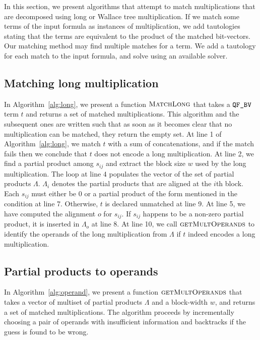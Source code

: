 %
In this section, we %
present algorithms that attempt to match multiplications that are
decomposed using long or Wallace tree multiplication.
%
If we match some terms of the input formula
as instances of 
multiplication, we add tautologies stating that the terms are 
equivalent to the product of the matched bit-vectors.
%
Our matching method may find multiple matches for a term.
%
We add a tautology for each match to the input formula, and solve using
an available solver.

\subsection{Matching long multiplication}


In Algorithm~\ref{alg:long}, we present a function $\textsc{MatchLong}$
that takes a $\texttt{QF\_BV}$ term $t$ and returns a set of matched multiplications.
%
This algorithm and the subsequent ones are written such that as soon
as it becomes clear that no multiplication can be matched,
they return the empty set. 
%
At line 1 of Algorithm~\ref{alg:long}, we match $t$ with a sum of
concatenations, and if the match fails then we conclude that $t$ does not encode 
a long multiplication.
%
At line 2, we find a partial product among $s_{ij}$ and extract
the block size $w$ used by the long multiplication.
%
The loop at line $4$ populates the vector of the set of partial products $\Lambda$.
%
$\Lambda_i$ denotes the partial products that are aligned at the $i$th block.
%
Each $s_{ij}$ must either be $0$ or a partial product of the form mentioned in the
condition at line 7.
%
Otherwise, $t$ is declared unmatched at line 9. 
%
At line 5, we have computed the alignment $o$ for $s_{ij}$.
%
If $s_{ij}$ happens to be a non-zero partial product, it is inserted in
$\Lambda_o$ at line 8.
%
At line 10, we call $\textsc{getMultOperands}$ to identify the operands
of the long multiplication from $\Lambda$ if $t$ indeed encodes a long
multiplication.

\subsection{Partial products to operands}


In Algorithm~\ref{alg:operand}, we present a function
$\textsc{getMultOperands}$ that takes a vector of multiset of partial
products $\Lambda$ and a block-width $w$, and returns a set of matched
multiplications.
%
The algorithm proceeds by incrementally choosing a pair of operands with
insufficient information and backtracks if the guess is found to be
wrong.


